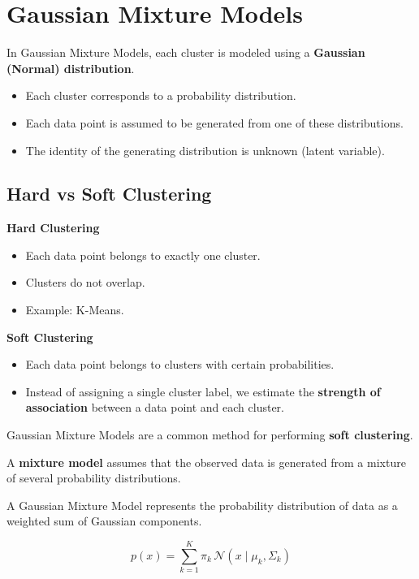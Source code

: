\documentclass[10pt,a4paper]{article}
\begin{document}
	\section{Gaussian Mixture Models}
	In Gaussian Mixture Models, each cluster is modeled using a \textbf{Gaussian (Normal) distribution}.

	\begin{itemize}
		\item Each cluster corresponds to a probability distribution.
		\item Each data point is assumed to be generated from one of these distributions.
		\item The identity of the generating distribution is unknown (latent variable).
	\end{itemize}


	\subsection{Hard vs Soft Clustering}

	\textbf{Hard Clustering}

	\begin{itemize}
		\item Each data point belongs to exactly one cluster.
		\item Clusters do not overlap.
		\item Example: K-Means.
	\end{itemize}

	\textbf{Soft Clustering}

	\begin{itemize}
		\item Each data point belongs to clusters with certain probabilities.
		\item Instead of assigning a single cluster label, we estimate the \textbf{strength of association} between a data point and each cluster.
	\end{itemize}

	Gaussian Mixture Models are a common method for performing \textbf{soft clustering}.

	A \textbf{mixture model} assumes that the observed data is generated from a mixture of several probability distributions.

	A Gaussian Mixture Model represents the probability distribution of data as a weighted sum of Gaussian components.

	\[
	p(x) = \sum_{k=1}^{K} \pi_k \, \mathcal{N}(x \mid \mu_k, \Sigma_k)
	\]
\end{document}
